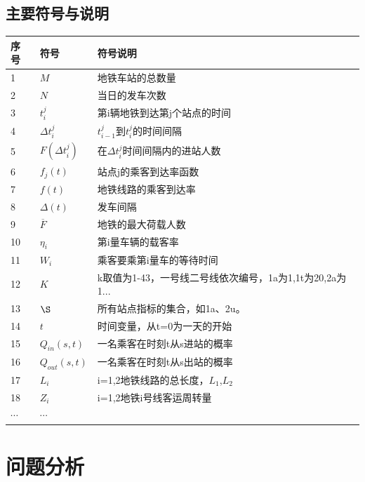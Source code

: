 \documentclass[12pt,a4paper]{mcmthesis}
\newcommand{\headcol}{\rowcolor{tableheadcolor}}
\begin{document}
\subsection{主要符号与说明}

\begin{table}[h!]
	\centering
	\small
	\begin{tabular}{p{60pt}<{\centering}|p{60pt}<{\centering}p{180pt}<{\raggedright}}
		\hline
		\headcol 序号 & 符号 & 符号说明 \\
		\hline
		1 & $M$ & 地铁车站的总数量 \\
		2 & $N$ & 当日的发车次数\\
		3 & $t_{i}^{j}$ & 第i辆地铁到达第j个站点的时间\\
		4 & $\Delta {t_i^j}$ & $t_{i-1}^{j}$到$t_i^j$的时间间隔\\
		5 & $F(\Delta {t_i^j})$ & 在$\Delta t_i^j$时间间隔内的进站人数\\
		6 & $f_j(t)$ & 站点j的乘客到达率函数 \\
		7 & ${f(t)}$ & 地铁线路的乘客到达率\\
		8 & $\Delta(t)$ & 发车间隔 \\
		9 & $\overline{F}$ & 地铁的最大荷载人数 \\
		10 & $\eta_i$ & 第i量车辆的载客率\\
		11 & $W_i$ & 乘客要乘第i量车的等待时间 \\
		12 & $K$ & k取值为1-43，一号线二号线依次编号，1a为1,1t为20,2a为1... \\
		13 & $\S$ & 所有站点指标的集合，如1a、2u。 \\
		14 & $t$ &时间变量，从t=0为一天的开始\\
		15 &$Q_{in}(s,t)$&一名乘客在时刻t从s进站的概率\\
		16 &$Q_{out}(s,t)$&一名乘客在时刻t从s出站的概率\\
		17 &$L_i$& i={1,2}地铁线路的总长度，$L_1$,$L_2$\\
		18 &$Z_i$& i={1,2}地铁i号线客运周转量\\
		$\cdots$ & $\cdots$ \\
		\hline
	\end{tabular}
	\label{symbol}
\end{table}



\section{问题分析}
\end{document}
